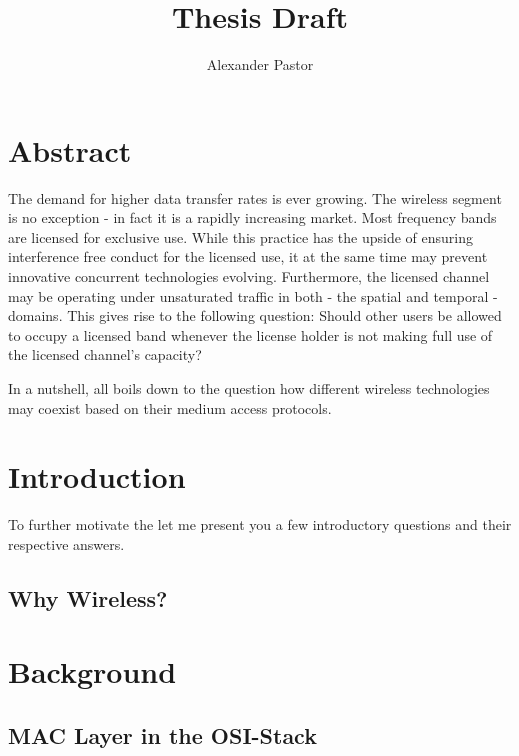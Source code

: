 \documentclass{article}
\begin{document}
	
\title{Thesis Draft}
\author{Alexander Pastor}
\maketitle

\clearpage
\tableofcontents
\clearpage

\section{Abstract}

The demand for higher data transfer rates is ever growing. The wireless segment is no exception - in fact it is a rapidly increasing market. Most frequency bands are licensed for exclusive use. While this practice has the upside of ensuring interference free conduct for the licensed use, it at the same time may prevent innovative concurrent technologies evolving. Furthermore, the licensed channel may be operating under unsaturated traffic in both - the spatial and temporal - domains. This gives rise to the following question: Should other users be allowed to occupy a licensed band whenever the license holder is not making full use of the licensed channel's capacity?

% 

In a nutshell, all boils down to the question how different wireless technologies may coexist based on their medium access protocols.

\clearpage

\section{Introduction}

To further motivate the let me present you a few introductory questions and their respective answers.

\subsection{Why Wireless?}

\section{Background}

\subsection{MAC Layer in the OSI-Stack}
\end{document}
